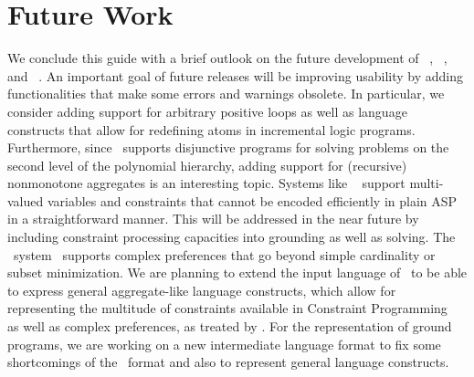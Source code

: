 \section{Future Work}\label{sec:future}

We conclude this guide with a brief outlook on the future development
of \gringo~\cite{gescth07a}, \clasp~\cite{gekasc09c}, and \clingo~\cite{gekakasc14b}.
An important goal of future releases will be improving usability
by adding functionalities that make some errors and warnings obsolete.
In particular, we consider adding support for arbitrary positive loops
as well as language constructs that allow for redefining atoms in incremental logic programs.
Furthermore, since \clasp\ supports disjunctive programs for solving problems on the second level of the polynomial hierarchy, 
adding support for (recursive) nonmonotone aggregates is an interesting topic.
Systems like \clingcon~\cite{geossc09a,ostsch12a} support multi-valued variables and constraints that cannot be encoded efficiently in plain ASP in a straightforward manner.
This will be addressed in the near future by including constraint processing capacities into grounding as well as solving.
The \asprin\ system~\cite{brderosc15a} supports complex preferences that go beyond simple cardinality or subset minimization.
We are planning to extend the input language of \gringo\ to be able to express general aggregate-like language constructs,
which allow for representing the multitude of constraints available in Constraint Programming~\cite{CPHandbook} 
as well as complex preferences, as treated by \asprin.
For the representation of ground programs,
we are working on a new intermediate language format to fix some shortcomings of the \smodels\ format
and also to represent general language constructs.

